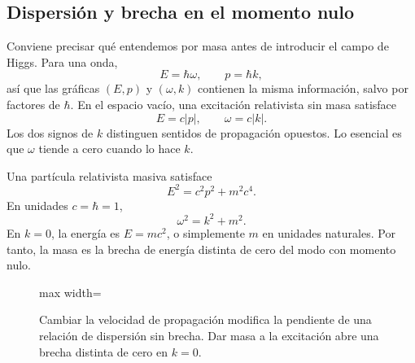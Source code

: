 \subsection{Dispersión y brecha en el momento nulo}

Conviene precisar qué entendemos por masa antes de introducir el campo de Higgs. Para una onda,
\begin{equation}
  E=\hbar\omega,
  \qquad
  p=\hbar k,
  \label{eq:l08-quantum-wave}
\end{equation}
así que las gráficas \((E,p)\) y \((\omega,k)\) contienen la misma información, salvo por factores de \(\hbar\). En el espacio vacío, una excitación relativista sin masa satisface
\begin{equation}
  E=c|p|,
  \qquad
  \omega=c|k|.
  \label{eq:l08-massless-dispersion}
\end{equation}
Los dos signos de \(k\) distinguen sentidos de propagación opuestos. Lo esencial es que \(\omega\) tiende a cero cuando lo hace \(k\).

Una partícula relativista masiva satisface
\begin{equation}
  E^2=c^2p^2+m^2c^4.
  \label{eq:l08-massive-dispersion}
\end{equation}
En unidades \(c=\hbar=1\),
\begin{equation}
  \omega^2=k^2+m^2.
\end{equation}
En \(k=0\), la energía es \(E=mc^2\), o simplemente \(m\) en unidades naturales. Por tanto, la masa es la brecha de energía distinta de cero del modo con momento nulo.

\begin{figure}[htbp]
\centering
\begin{adjustbox}{max width=\linewidth}
\end{adjustbox}
\caption{Cambiar la velocidad de propagación modifica la pendiente de una relación de dispersión sin brecha. Dar masa a la excitación abre una brecha distinta de cero en \(k=0\).}
\label{fig:l08-dispersion}
\end{figure}

